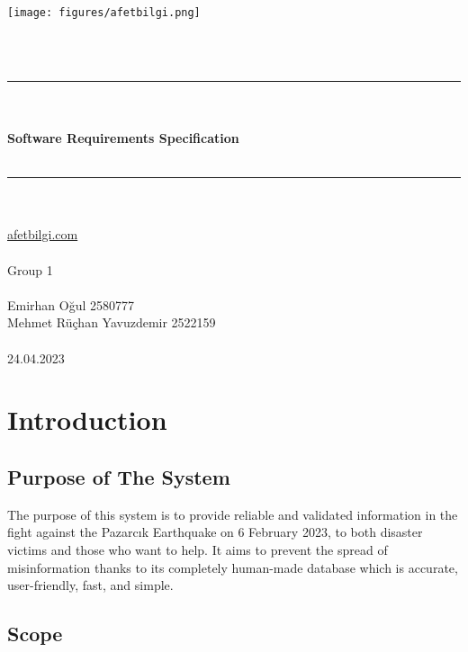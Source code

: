 \documentclass[listof=nochaptergap]{report}
\begin{document}

\begin{center}
    \texttt{[image: figures/afetbilgi.png]}

    ~\\
    ~\\

\hrule
~\\
~\\
    \Huge{\textbf{Software Requirements Specification}}
~\\
~\\
\hrule
    ~\\
    ~\\
    \href{https://afetbilgi.com}{afetbilgi.com}
    ~\\
    ~\\
    \Large{Group 1}
    ~\\
    ~\\
    \LARGE{Emirhan Oğul 2580777} \\ 
    \LARGE{Mehmet Rüçhan Yavuzdemir 2522159} \\
    ~\\
    \Large{24.04.2023}
\end{center}


\newpage


\tableofcontents



\newpage
\listoffigures
\newpage
\listoftables
\newpage



\chapter{Introduction}
\section{Purpose of The System}
\par The purpose of this system is to provide reliable and validated information in the fight against the Pazarcık Earthquake on 6 February 2023, to both disaster victims and those who want to help. It aims to prevent the spread of misinformation thanks to its completely human-made database which is accurate, user-friendly, fast, and simple. 

\section{Scope}
\end{document}
